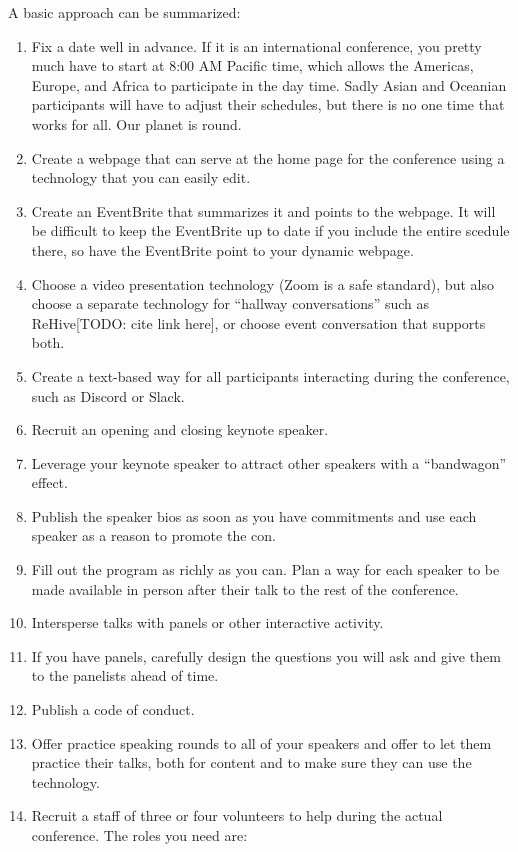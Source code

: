 \documentclass[
	fontsize=10pt, %
	twoside=false, %
	secnumdepth=1, %
]{kaobook}
\begin{document}
A basic approach can be summarized:
\begin{enumerate}
\item Fix a date well in advance. If it is an international conference, you pretty much have
  to start at 8:00 AM Pacific time, which allows the Americas, Europe, and Africa to
  participate in the day time. Sadly Asian and Oceanian participants will have to adjust
  their schedules, but there is no one time that works for all. Our planet is round.
\item Create a webpage that can serve at the home page for the conference using a technology
  that you can easily edit.
\item Create an EventBrite that summarizes it and points to the webpage. It will be
  difficult to keep the EventBrite up to date if you include the entire scedule there, so have the EventBrite point to your dynamic webpage.
\item Choose a video presentation technology (Zoom is a safe standard), but also
  choose a separate technology for ``hallway conversations'' such as ReHive[TODO: cite link here], or choose event conversation
  that supports both.
  \item Create a text-based way for all participants interacting during the conference, such as Discord or Slack.
\item Recruit an opening and closing keynote speaker.
\item Leverage your keynote speaker to attract other speakers with a ``bandwagon'' effect.
\item Publish the speaker bios as soon as you have commitments and use each speaker
  as a reason to promote the con.
\item Fill out the program as richly as you can. Plan a way for each speaker to be made
  available in person after their talk to the rest of the conference.
\item Intersperse talks with panels or other interactive activity.
  \item If you have panels, carefully design the questions you will ask and give them to the panelists ahead of time.
  \item Publish a code of conduct.
  \item Offer practice speaking rounds to all of your speakers and offer to let them practice their talks,
    both for content and to make sure they can use the technology.
\item Recruit a staff of three or four volunteers to help during the actual conference. The roles you need are:

\end{enumerate}
\end{document}
